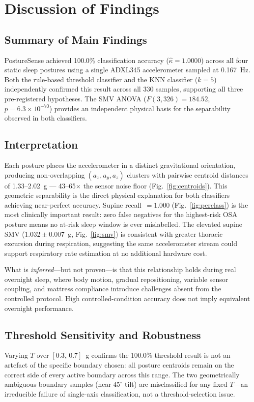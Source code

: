 \documentclass[journal]{IEEEtran}
\begin{document}
\section{Discussion of Findings}

\subsection{Summary of Main Findings}
PostureSense achieved 100.0\% classification accuracy ($\hat{\kappa}=1.0000$)
across all four static sleep postures using a single ADXL345 accelerometer
sampled at 0.167~Hz. Both the rule-based threshold classifier and the KNN
classifier ($k=5$) independently confirmed this result across all 330
samples, supporting all three pre-registered hypotheses. The SMV ANOVA
($F(3,326)=184.52$, $p=6.3\times10^{-70}$) provides an independent physical
basis for the separability observed in both classifiers.

\subsection{Interpretation}
Each posture places the accelerometer in a distinct gravitational orientation,
producing non-overlapping $(a_x,a_y,a_z)$ clusters with pairwise centroid
distances of 1.33--2.02~g --- 43--65$\times$ the sensor noise floor
(Fig.~\ref{fig:centroids}). This geometric separability is the direct
physical explanation for both classifiers achieving near-perfect accuracy.
Supine recall~$=1.000$ (Fig.~\ref{fig:perclass}) is the most clinically
important result: zero false negatives for the highest-risk OSA posture
means no at-risk sleep window is ever mislabelled. The elevated supine
SMV ($1.032\pm0.007$~g, Fig.~\ref{fig:smv}) is consistent with greater
thoracic excursion during respiration, suggesting the same accelerometer
stream could support respiratory rate estimation at no additional hardware cost.

What is \textit{inferred}---but not proven---is that this relationship holds
during real overnight sleep, where body motion, gradual repositioning,
variable sensor coupling, and mattress compliance introduce challenges absent
from the controlled protocol. High controlled-condition accuracy does not
imply equivalent overnight performance.

\subsection{Threshold Sensitivity and Robustness}
Varying $T$ over $[0.3,\,0.7]$~g confirms the 100.0\% threshold result is
not an artefact of the specific boundary chosen: all posture centroids remain
on the correct side of every active boundary across this range. The two
geometrically ambiguous boundary samples (near $45^\circ$ tilt) are
misclassified for any fixed $T$---an irreducible failure of single-axis
classification, not a threshold-selection issue.
\end{document}
